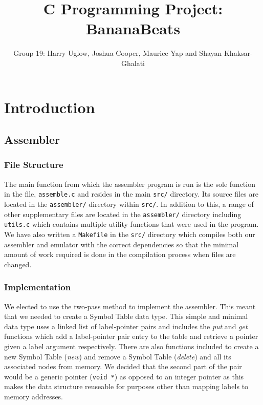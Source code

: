 \documentclass[11pt]{article}
\begin{document}
\sloppy
\title{C Programming Project: BananaBeats}
\author{Group 19: Harry Uglow, Joshua Cooper, Maurice Yap and Shayan Khaksar-Ghalati}

\maketitle

\section{Introduction}

\subsection{Assembler}
\subsubsection{File Structure}
The main function from which the assembler program is run is the sole function in the file, \texttt{assemble.c} and resides in the main \texttt{src/} directory. Its source files are located in the \texttt{assembler/} directory within \texttt{src/}. In addition to this, a range of other supplementary files are located in the \texttt{assembler/} directory including \texttt{utils.c} which contains multiple utility functions that were used in the program. We have also written a \texttt{Makefile} in the \texttt{src/} directory which compiles both our assembler and emulator with the correct dependencies so that the minimal amount of work required is done in the compilation process when files are changed.
\subsubsection{Implementation}
We elected to use the two-pass method to implement the assembler. This meant that we needed to create a Symbol Table data type. This simple and minimal data type uses a linked list of label-pointer pairs and includes the \textit{put} and \textit{get} functions which add a label-pointer pair entry to the table and retrieve a pointer given a label argument respectively. There are also functions included to create a new Symbol Table (\textit{new}) and remove a Symbol Table (\textit{delete}) and all its associated nodes from memory. We decided that the second part of the pair would be a generic pointer (\texttt{void *}) as opposed to an integer pointer as this makes the data structure reuseable for purposes other than mapping labels to memory addresses.\\
\end{document}
